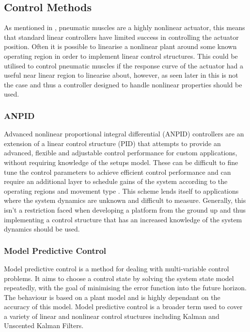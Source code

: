 \documentclass[11pt,a4paper]{article}
\begin{document}
\subsection{Control Methods}
\label{sub:control_methods}
As mentioned in , pneumatic muscles are a highly nonlinear actuator, this means that standard linear controllers have limited success in controlling the actuator position. Often it is possible to linearise a nonlinear plant around some known operating region in order to implement linear control structures. This could be utilised to control pneumatic muscles if the response curve of the actuator had a useful near linear region to linearise about, however, as seen later in  this is not the case and thus a controller designed to handle nonlinear properties should be used. 

\subsubsection{ANPID}
\label{sub:pid}
Advanced nonlinear proportional integral differential (ANPID) controllers are an extension of a linear control structure (PID) that attempts to provide an advanced, flexible and adjustable control performance for custom applications, without requiring knowledge of the setups model. These can be difficult to fine tune the control parameters to achieve efficient control performance and can require an additional layer to schedule gains of the system according to the operating regions and movement type \cite{andrikopoulos_nikolakopoulos_2017}. This scheme lends itself to applications where the system dynamics are unknown and difficult to measure. Generally, this isn't a restriction faced when developing a platform from the ground up and thus implementing a control structure that has an increased knowledge of the system dynamics should be used.

\subsubsection{Model Predictive Control}
\label{sub:model_predictive_control}
Model predictive control is a method for dealing with multi-variable control problems. It aims to choose a control state by solving the system state model repeatedly, with the goal of minimising the error function into the future horizon. The behaviour is based on a plant model and is highly dependant on the accuracy of this model. Model predictive control is a broader term used to cover a variety of linear and nonlinear control stuctures including Kalman and Unscented Kalman Filters.
\end{document}
